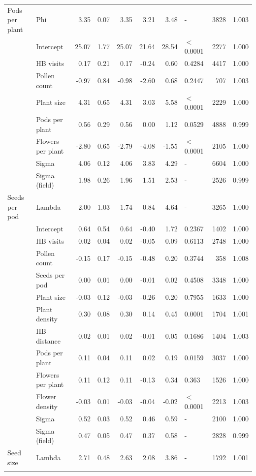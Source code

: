 \begin{longtable}{l|l|r|r|r|r|r|l|r|r}
\cline{2-10}
\multirow{-6}{*}{\raggedright\arraybackslash Pods per plant} & Phi & 3.35 & 0.07 & 3.35 & 3.21 & 3.48 & - & 3828 & 1.003\\
\cline{1-10}
 & Intercept & 25.07 & 1.77 & 25.07 & 21.64 & 28.54 & $<$0.0001 & 2277 & 1.000\\
\cline{2-10}
 & HB visits & 0.17 & 0.21 & 0.17 & -0.24 & 0.60 & 0.4284 & 4417 & 1.000\\
\cline{2-10}
 & Pollen count & -0.97 & 0.84 & -0.98 & -2.60 & 0.68 & 0.2447 & 707 & 1.003\\
\cline{2-10}
 & Plant size & 4.31 & 0.65 & 4.31 & 3.03 & 5.58 & $<$0.0001 & 2229 & 1.000\\
\cline{2-10}
 & Pods per plant & 0.56 & 0.29 & 0.56 & 0.00 & 1.12 & 0.0529 & 4888 & 0.999\\
\cline{2-10}
 & Flowers per plant & -2.80 & 0.65 & -2.79 & -4.08 & -1.55 & $<$0.0001 & 2105 & 1.000\\
\cline{2-10}
 & Sigma & 4.06 & 0.12 & 4.06 & 3.83 & 4.29 & - & 6604 & 1.000\\
\cline{2-10}
 & Sigma (field) & 1.98 & 0.26 & 1.96 & 1.51 & 2.53 & - & 2526 & 0.999\\
\cline{2-10}
\multirow{-9}{*}{\raggedright\arraybackslash Seeds per pod} & Lambda & 2.00 & 1.03 & 1.74 & 0.84 & 4.64 & - & 3265 & 1.000\\
\cline{1-10}
 & Intercept & 0.64 & 0.54 & 0.64 & -0.40 & 1.72 & 0.2367 & 1402 & 1.000\\
\cline{2-10}
 & HB visits & 0.02 & 0.04 & 0.02 & -0.05 & 0.09 & 0.6113 & 2748 & 1.000\\
\cline{2-10}
 & Pollen count & -0.15 & 0.17 & -0.15 & -0.48 & 0.20 & 0.3744 & 358 & 1.008\\
\cline{2-10}
 & Seeds per pod & 0.00 & 0.01 & 0.00 & -0.01 & 0.02 & 0.4508 & 3348 & 1.000\\
\cline{2-10}
 & Plant size & -0.03 & 0.12 & -0.03 & -0.26 & 0.20 & 0.7955 & 1633 & 1.000\\
\cline{2-10}
 & Plant density & 0.30 & 0.08 & 0.30 & 0.14 & 0.45 & 0.0001 & 1704 & 1.001\\
\cline{2-10}
 & HB distance & 0.02 & 0.01 & 0.02 & -0.01 & 0.05 & 0.1686 & 1404 & 1.003\\
\cline{2-10}
 & Pods per plant & 0.11 & 0.04 & 0.11 & 0.02 & 0.19 & 0.0159 & 3037 & 1.000\\
\cline{2-10}
 & Flowers per plant & 0.11 & 0.12 & 0.11 & -0.13 & 0.34 & 0.363 & 1526 & 1.000\\
\cline{2-10}
 & Flower density & -0.03 & 0.01 & -0.03 & -0.04 & -0.02 & $<$0.0001 & 2213 & 1.003\\
\cline{2-10}
 & Sigma & 0.52 & 0.03 & 0.52 & 0.46 & 0.59 & - & 2100 & 1.000\\
\cline{2-10}
 & Sigma (field) & 0.47 & 0.05 & 0.47 & 0.37 & 0.58 & - & 2828 & 0.999\\
\cline{2-10}
\multirow{-13}{*}{\raggedright\arraybackslash Seed size} & Lambda & 2.71 & 0.48 & 2.63 & 2.08 & 3.86 & - & 1792 & 1.001\\
\hline
\label{tab:commCoefs}
\end{longtable}
\endgroup{}


